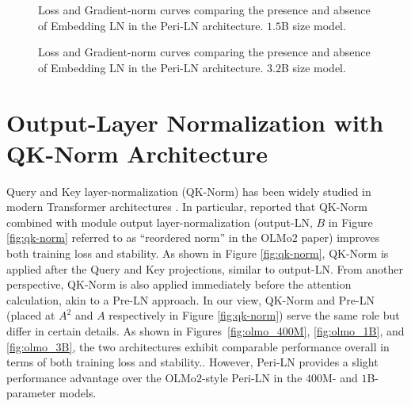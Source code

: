 \begin{figure}[ht!]
    \centering
    \caption{Loss and Gradient-norm curves comparing the presence and absence of Embedding LN in the Peri-LN architecture. $1.5$B size model.}
    \label{fig:embedding_1B}
\end{figure}

\begin{figure}[ht!]
    \centering
    \caption{Loss and Gradient-norm curves comparing the presence and absence of Embedding LN in the Peri-LN architecture. $3.2$B size model.}
    \label{fig:embedding_3B}
\end{figure}


\newpage
\section{Output-Layer Normalization with QK-Norm Architecture} \label{appendix:olmo2}
Query and Key layer-normalization (QK-Norm) has been widely studied in modern Transformer architectures \citep{smallproxies, attentioncollapse, olmo2}. In particular, \citet{olmo2} reported that QK-Norm combined with module output layer-normalization (output-LN, $B$ in Figure \ref{fig:qk-norm} referred to as “reordered norm” in the OLMo$2$ paper) improves both training loss and stability. As shown in Figure \ref{fig:qk-norm}, QK-Norm is applied after the Query and Key projections, similar to output-LN. From another perspective, QK-Norm is also applied immediately before the attention calculation, akin to a Pre-LN approach. In our view, QK-Norm and Pre-LN (placed at $A^2$ and $A$ respectively in Figure \ref{fig:qk-norm}) serve the same role but differ in certain details. As shown in Figures~\ref{fig:olmo_400M}, \ref{fig:olmo_1B}, and \ref{fig:olmo_3B}, the two architectures exhibit comparable performance overall in terms of both training loss and stability.. However, Peri-LN provides a slight performance advantage over the OLMo$2$-style Peri-LN in the $400$M- and $1$B-parameter models.

